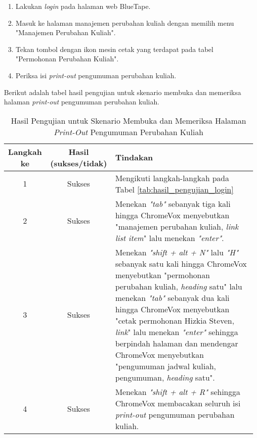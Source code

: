 \begin{enumerate}
    \item Lakukan \textit{login} pada halaman web BlueTape.
    \item Masuk ke halaman manajemen perubahan kuliah dengan memilih menu "Manajemen Perubahan Kuliah".
    \item Tekan tombol dengan ikon mesin cetak yang terdapat pada tabel "Permohonan Perubahan Kuliah".
    \item Periksa isi \textit{print-out} pengumuman perubahan kuliah.
\end{enumerate}

Berikut adalah tabel hasil pengujian untuk skenario membuka dan memeriksa halaman \textit{print-out} pengumuman perubahan kuliah.

\begin{table}[H]
    \centering 
    \caption{Hasil Pengujian untuk Skenario Membuka dan Memeriksa Halaman \textit{Print-Out} Pengumuman Perubahan Kuliah}
    \label{tab:hasil_pengujian_membuka_dan_memeriksa_halaman_print_out_pengumuman_perubahan_kuliah}
    \begin{tabular}{|c|c|p{10cm}|}
        \toprule
        Langkah ke & Hasil (sukses/tidak) & Tindakan \\

        \midrule
        1 & Sukses & Mengikuti langkah-langkah pada Tabel \ref{tab:hasil_pengujian_login} \\
        2 & Sukses & Menekan \textit{"tab"} sebanyak tiga kali hingga ChromeVox menyebutkan "manajemen perubahan kuliah, \textit{link list item}" lalu menekan \textit{"enter"}. \\
        3 & Sukses & Menekan \textit{"shift + alt + N"} lalu \textit{"H"} sebanyak satu kali hingga ChromeVox menyebutkan "permohonan perubahan kuliah, \textit{heading} satu" lalu menekan \textit{"tab"} sebanyak dua kali hingga ChromeVox menyebutkan "cetak permohonan Hizkia Steven, \textit{link}" lalu menekan \textit{"enter"} sehingga berpindah halaman dan mendengar ChromeVox menyebutkan "pengumuman jadwal kuliah, pengumuman, \textit{heading} satu". \\
        4 & Sukses & Menekan \textit{"shift + alt + R"} sehingga ChromeVox membacakan seluruh isi \textit{print-out} pengumuman perubahan kuliah. \\ 

        \bottomrule

    \end{tabular}
\end{table}

